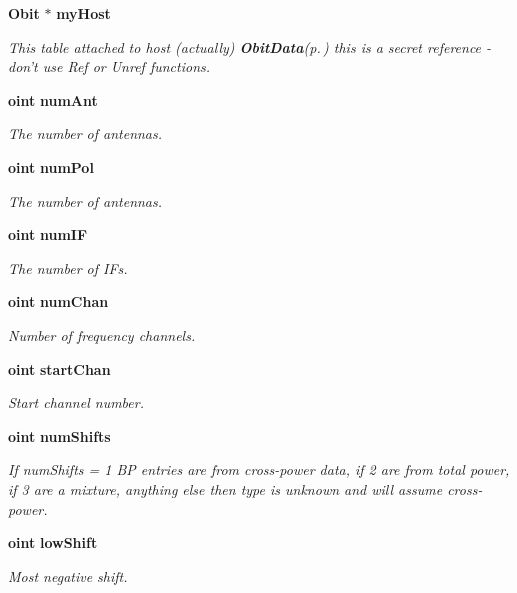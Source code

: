 \begin{CompactItemize}
{\bf Obit} $\ast$ {\bf my\-Host}
\begin{CompactList}\small\item\em This table attached to host (actually) {\bf Obit\-Data}{\rm (p.\,\pageref{structObitData})} this is a secret reference - don't use Ref or Unref functions. \item\end{CompactList}\item 
{\bf oint} {\bf num\-Ant}
\begin{CompactList}\small\item\em The number of antennas. \item\end{CompactList}\item 
{\bf oint} {\bf num\-Pol}
\begin{CompactList}\small\item\em The number of antennas. \item\end{CompactList}\item 
{\bf oint} {\bf num\-IF}
\begin{CompactList}\small\item\em The number of IFs. \item\end{CompactList}\item 
{\bf oint} {\bf num\-Chan}
\begin{CompactList}\small\item\em Number of frequency channels. \item\end{CompactList}\item 
{\bf oint} {\bf start\-Chan}
\begin{CompactList}\small\item\em Start channel number. \item\end{CompactList}\item 
{\bf oint} {\bf num\-Shifts}
\begin{CompactList}\small\item\em If num\-Shifts = 1 BP entries are from cross-power data, if 2 are from total power, if 3 are a mixture, anything else then type is unknown and will assume cross-power. \item\end{CompactList}\item 
{\bf oint} {\bf low\-Shift}
\begin{CompactList}\small\item\em Most negative shift. \item\end{CompactList}\item 

\end{CompactItemize}
